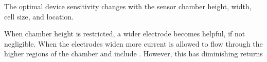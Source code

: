 \label{ch: discussion}

\par The optimal device sensitivity changes with the sensor chamber height, width, cell size, and location.

\par When chamber height is restricted, a wider electrode becomes helpful, if not negligible. When the electrodes widen more current  is allowed to flow through the higher regions of the chamber and include . However, this has diminishing returns